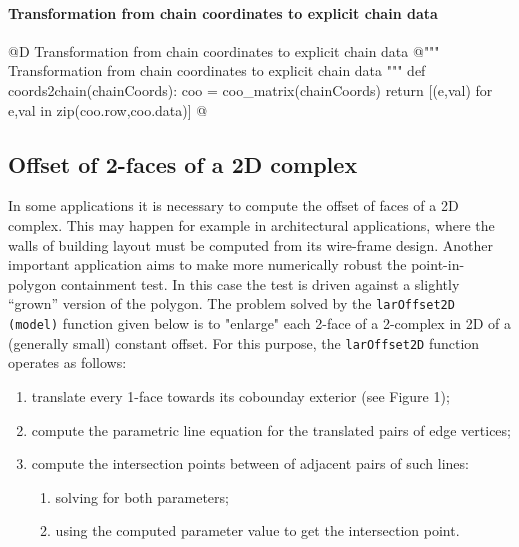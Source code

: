 \documentclass[11pt,oneside]{article}    %
\begin{document}
\paragraph{Transformation from chain coordinates to explicit chain data}
@D Transformation from chain coordinates to explicit chain data
@{""" Transformation from chain coordinates to explicit chain data """
def coords2chain(chainCoords):
    coo = coo_matrix(chainCoords)
    return [(e,val) for e,val in zip(coo.row,coo.data)]
@}


\subsection{Offset of 2-faces of a 2D complex}
In some applications it is necessary to compute the offset of faces of a 2D complex. This may happen for example in architectural applications, where the walls of building layout must be computed from its wire-frame design. Another important application aims to make more numerically robust the point-in-polygon containment test. In this case the test is driven against a slightly ``grown'' version of the polygon.
The problem solved by the \texttt{larOffset2D (model)} function given below is to "enlarge" each 2-face of a 2-complex in 2D of a (generally small) constant offset.  
For this purpose, the \texttt{larOffset2D} function operates as follows:

\begin{enumerate}
\item translate every 1-face towards its cobounday exterior (see Figure 1);
\item compute the parametric line equation for the translated pairs of edge vertices;
\item compute the intersection points between of adjacent pairs of such lines:
    \begin{enumerate}
    \item solving for both parameters;
    \item using the computed parameter value to get the intersection point.
    \end{enumerate}
\end{enumerate}
	
\end{document}
